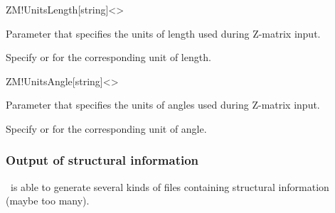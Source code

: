 \begin{fdfentry}{ZM!UnitsLength}[string]<>

  Parameter that specifies the units of length used during Z-matrix
  input.

  Specify  or  for the corresponding unit of length.
  
\end{fdfentry}

\begin{fdfentry}{ZM!UnitsAngle}[string]<>

  Parameter that specifies the units of angles used during Z-matrix input.

  Specify  or  for the corresponding unit of angle.

\end{fdfentry}


\subsubsection{Output of structural information}

\siesta\ is able to generate several kinds of files containing
structural information (maybe too many).

